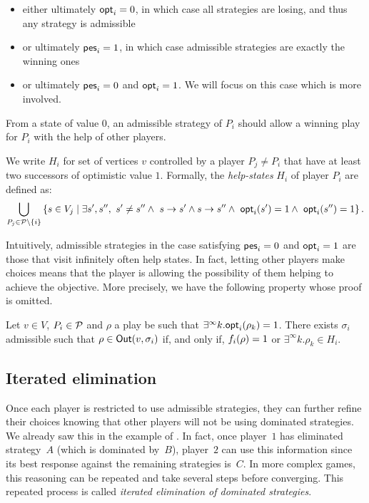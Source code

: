 \begin{itemize}
\item   either ultimately \(\textsf{opt}_i = 0\), in which case all strategies are
  losing, and thus any strategy is admissible
\item   or ultimately \(\textsf{pes}_i = 1\), in which case admissible strategies are
  exactly the winning ones
\item   or ultimately \(\textsf{pes}_i = 0\) and \(\textsf{opt}_i = 1\). We will focus on this
case which is more involved.
\end{itemize}

From a state of value \(0\), an admissible strategy of \(P_i\) should
allow a winning play for \(P_i\) with the help of other players.

We write \(H_i\) for set of vertices \(v\) controlled by a player
\(P_j\ne P_i\) that have at least two successors of optimistic value
\(1\). Formally, the \emph{help-states} $H_i$ of player \(P_i\) are defined
as:
\[
 \bigcup_{P_j\in \mathcal{P} \setminus\{i\}} \left\{ s \in V_j \mid \exists s',s'',\ s' \neq s'' \wedge\ s\rightarrow s' \land s \rightarrow s'' \wedge\ \textsf{opt}_i(s') = 1 \wedge\ \textsf{opt}_i(s'') = 1 \right\}.
\]

Intuitively, admissible strategies in the case satisfying \(\textsf{pes}_i = 0\) and \(\textsf{opt}_i = 1\)
are those that visit infinitely often help states. In fact, letting other players make choices
means that the player is allowing the possibility of them helping to achieve the objective.
More precisely, we have the following property whose proof is omitted.
\begin{lemma}
Let \(v\in V\), \(P_i\in \mathcal{P}\) and \(\rho\) a play be
such that \(\exists^\infty k. \textsf{opt}_{i}(\rho_k) = 1\). There exists
\(\sigma_i\) admissible such that \(\rho \in \textsf{Out}(v, \sigma_i)\) if, and
only if, \(f_i(\rho) = 1\) or
\(\exists^\infty k. \rho_k \in H_i\).
\end{lemma}

\subsection{Iterated elimination}\label{iterated-elimination}

Once each player is restricted to use admissible strategies, they can
further refine their choices knowing that other players will not be using dominated strategies.
We already saw this in the example of .
In fact, once player~$1$ has eliminated strategy~$A$ (which is dominated by~$B$),
player~$2$ can use this information since its best response against the remaining strategies is~$C$.
In more complex games, this reasoning can be repeated and take several steps before converging.
This repeated process is called \emph{iterated elimination of dominated strategies}.

